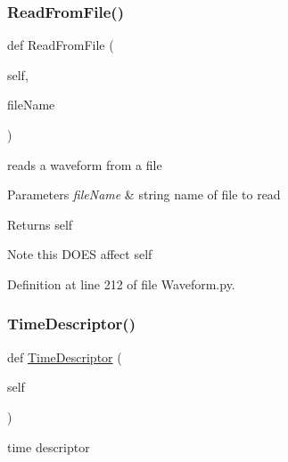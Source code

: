 \subsubsection{\texorpdfstring{Read\+From\+File()}{ReadFromFile()}}
{\footnotesize\ttfamily def Read\+From\+File (\begin{DoxyParamCaption}\item[{}]{self,  }\item[{}]{file\+Name }\end{DoxyParamCaption})}



reads a waveform from a file 


\begin{DoxyParams}{Parameters}
{\em file\+Name} & string name of file to read \\
\hline
\end{DoxyParams}
\begin{DoxyReturn}{Returns}
self 
\end{DoxyReturn}
\begin{DoxyNote}{Note}
this D\+O\+ES affect self 
\end{DoxyNote}


Definition at line 212 of file Waveform.\+py.

\mbox{\label{classSignalIntegrity_1_1TimeDomain_1_1Waveform_1_1Waveform_1_1Waveform_ab3bfca96556298bcd23762dfefbc7d6e}} 
\subsubsection{\texorpdfstring{Time\+Descriptor()}{TimeDescriptor()}}
{\footnotesize\ttfamily def \hyperlink{classSignalIntegrity_1_1TimeDomain_1_1Waveform_1_1TimeDescriptor_1_1TimeDescriptor}{Time\+Descriptor} (\begin{DoxyParamCaption}\item[{}]{self }\end{DoxyParamCaption})}



time descriptor 

